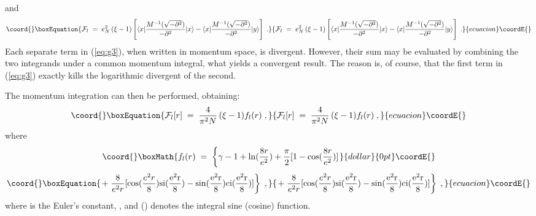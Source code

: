 \documentclass[12pt,a4paper]{article} \usepackage[latin1] {inputenc}
\begin{document}
and
\begin{equation}\coord{}\boxEquation{\label{eq:g3}
 {\mathcal F}_l\;=\;e_N^2 \,(\xi - 1) \left[ 
\langle x| {\frac{M^{-1}(\sqrt{-\partial^2}) }{-\partial^2}} |x\rangle  
-  \langle x| {\frac{M^{-1}(\sqrt{-\partial^2}) }{-\partial^2}} |y\rangle \right]\;.
}{{\mathcal F}_l\;=\;e_N^2 \,(\xi - 1) \left[ 
\langle x| {\frac{M^{-1}(\sqrt{-\partial^2}) }{-\partial^2}} |x\rangle  
-  \langle x| {\frac{M^{-1}(\sqrt{-\partial^2}) }{-\partial^2}} |y\rangle \right]\;.
}{ecuacion}\coordE{}\end{equation}
Each separate term in (\ref{eq:g3}), when written in momentum space,
is divergent. However, their sum may be evaluated by combining the two
integrands under a common momentum integral, what yields a convergent
result. The reason is, of course, that the first term in (\ref{eq:g3})
exactly kills the logarithmic divergent of the second.

The momentum integration can then be performed, obtaining:
\begin{equation}\coord{}\boxEquation{
{\mathcal F}_l[r]\;=\;  \frac{4}{\pi^2 N } \,(\xi -1)
f_l(r) \;,
}{
{\mathcal F}_l[r]\;=\;  \frac{4}{\pi^2 N } \,(\xi -1)
f_l(r) \;,
}{ecuacion}\coordE{}\end{equation}
where
$$\coord{}\boxMath{
f_l(r)\;=\; \left\{ \gamma - 1 + \ln (\frac{8 r}{e^2}) +
  \frac{\pi}{2} [ 1 - \cos(\frac{8 r}{e^2})] \right.
}{dollar}{0pt}\coordE{}$$
\begin{equation}\coord{}\boxEquation{
\left. +\; \frac{8}{e^2 r} [ \cos(\frac{e^2r}{8}) 
\rm{si}(\frac{e^2r}{8})-  \sin(\frac{e^2r}{8}) \rm{ci}(\frac{e^2r}{8})]
\right\} \;,
}{
\left. +\; \frac{8}{e^2 r} [ \cos(\frac{e^2r}{8}) 
\rm{si}(\frac{e^2r}{8})-  \sin(\frac{e^2r}{8}) \rm{ci}(\frac{e^2r}{8})]
\right\} \;,
}{ecuacion}\coordE{}\end{equation}
where \myHighlight{$\gamma$}\coordHE{} is the Euler's constant, \coordHE{}, and
\coordHE{} (\coordHE{}) denotes the integral sine (cosine) function.
\end{document}
